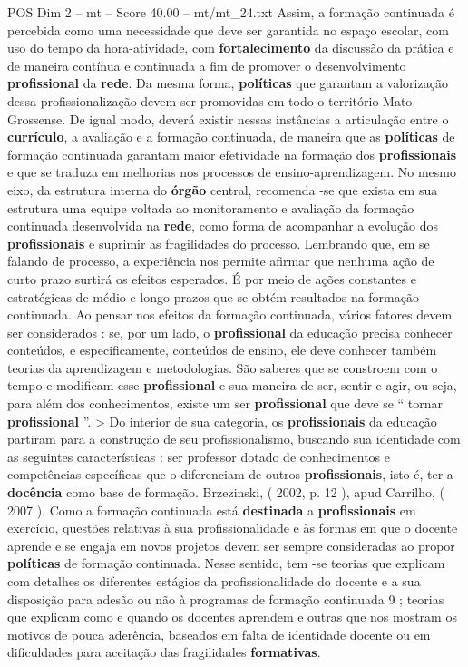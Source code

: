 \begin{textsample}{POS Dim 2 – mt – Score 40.00 – mt/mt\_24.txt}
Assim, a formação continuada é percebida como uma necessidade que deve ser garantida no espaço escolar, com uso do tempo da hora-atividade, com \textbf{fortalecimento} da discussão da prática e de maneira contínua e continuada a fim de promover o desenvolvimento \textbf{profissional} da \textbf{rede}.
Da mesma forma, \textbf{políticas} que garantam a valorização dessa profissionalização devem ser promovidas em todo o território Mato-Grossense.
De igual modo, deverá existir nessas instâncias a articulação entre o \textbf{currículo}, a avaliação e a formação continuada, de maneira que as \textbf{políticas} de formação continuada garantam maior efetividade na formação dos \textbf{profissionais} e que se traduza em melhorias nos processos de ensino-aprendizagem.
No mesmo eixo, da estrutura interna do \textbf{órgão} central, recomenda -se que exista em sua estrutura uma equipe voltada ao monitoramento e avaliação da formação continuada desenvolvida na \textbf{rede}, como forma de acompanhar a evolução dos \textbf{profissionais} e suprimir as fragilidades do processo.
Lembrando que, em se falando de processo, a experiência nos permite afirmar que nenhuma ação de curto prazo surtirá os efeitos esperados.
É por meio de ações constantes e estratégicas de médio e longo prazos que se obtém resultados na formação continuada.
Ao pensar nos efeitos da formação continuada, vários fatores devem ser considerados : se, por um lado, o \textbf{profissional} da educação precisa conhecer conteúdos, e especificamente, conteúdos de ensino, ele deve conhecer também teorias da aprendizagem e metodologias.
São saberes que se constroem com o tempo e modificam esse \textbf{profissional} e sua maneira de ser, sentir e agir, ou seja, para além dos conhecimentos, existe um ser \textbf{profissional} que deve se “ tornar \textbf{profissional} ”. > Do interior de sua categoria, os \textbf{profissionais} da educação partiram para a construção de seu profissionalismo, buscando sua identidade com as seguintes características : ser professor dotado de conhecimentos e competências específicas que o diferenciam de outros \textbf{profissionais}, isto é, ter a \textbf{docência} como base de formação.
Brzezinski, ( 2002, p. 12 ), apud Carrilho, ( 2007 ).
Como a formação continuada está \textbf{destinada} a \textbf{profissionais} em exercício, questões relativas à sua profissionalidade e às formas em que o docente aprende e se engaja em novos projetos devem ser sempre consideradas ao propor \textbf{políticas} de formação continuada.
Nesse sentido, tem -se teorias que explicam com detalhes os diferentes estágios da profissionalidade do docente e a sua disposição para adesão ou não à programas de formação continuada 9 ; teorias que explicam como e quando os docentes aprendem e outras que nos mostram os motivos de pouca aderência, baseados em falta de identidade docente ou em dificuldades para aceitação das fragilidades \textbf{formativas}.

\end{textsample}
